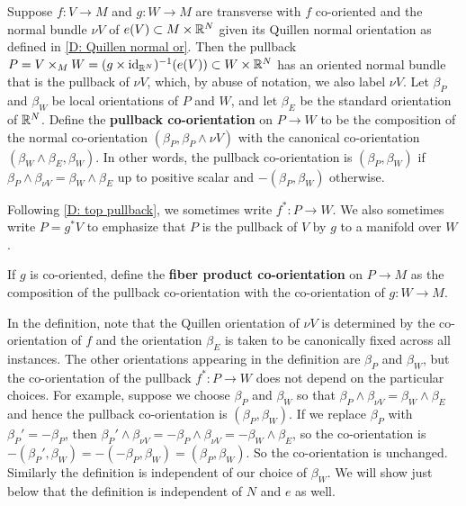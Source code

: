 \begin{definition}\label{D: pullback coorient}
	Suppose $f \colon V \to M$ and $g \colon W \to M$ are transverse with $f$ co-oriented and the normal bundle $\nu V$ of $e(V) \subset M \times \mathbb{R}^N$ given its Quillen normal orientation as defined in \cref{D: Quillen normal or}.
	Then the pullback $P = V \times_M W = (g \times \mathrm{id}_{\mathbb{R}^N})^{-1}(e(V)) \subset W \times \mathbb{R}^N$ has an oriented normal bundle that is the pullback of $\nu V$, which, by abuse of notation, we also label $\nu V$.
	Let $\beta_P$ and $\beta_W$ be local orientations of $P$ and $W$, and let $\beta_E$ be the standard orientation of $\mathbb{R}^N$.
	Define the \textbf{pullback co-orientation} on $P \to W$ to be the composition of the normal co-orientation $(\beta_P,\beta_P \wedge \nu V)$ with the canonical co-orientation $(\beta_W \wedge \beta_E,\beta_W)$.
	In other words, the pullback co-orientation is $(\beta_P,\beta_W)$ if $\beta_P \wedge \beta_{\nu V} = \beta_W \wedge \beta_E$ up to positive scalar and $-(\beta_P,\beta_W)$ otherwise.

	Following \cref{D: top pullback}, we sometimes write $f^* \colon P \to W$.
	We also sometimes write $P = g^*V$ to emphasize that $P$ is the pullback of $V$ by $g$ to a manifold over $W$.

	If $g$ is co-oriented, define the \textbf{fiber product co-orientation} on $P \to M$ as the composition of the pullback co-orientation with the co-orientation of $g \colon W \to M$.
\end{definition}

In the definition, note that the Quillen orientation of $\nu V$ is determined by the co-orientation of $f$ and the orientation $\beta_E$ is taken to be canonically fixed across all instances.
The other orientations appearing in the definition are $\beta_P$ and $\beta_W$, but the co-orientation of the pullback $f^* \colon P \to W$ does not depend on the particular choices.
For example, suppose we choose $\beta_P$ and $\beta_W$ so that $\beta_P \wedge \beta_{\nu V} = \beta_W \wedge \beta_E$ and hence the pullback co-orientation is $(\beta_P,\beta_W)$.
If we replace $\beta_P$ with $\beta_P' = -\beta_P$, then
$\beta_P' \wedge \beta_{\nu V} = -\beta_P \wedge \beta_{\nu V} = -\beta_W \wedge \beta_E$, so the co-orientation is $-(\beta_P',\beta_W) = -(-\beta_P,\beta_W) = (\beta_P,\beta_W)$.
So the co-orientation is unchanged.
Similarly the definition is independent of our choice of $\beta_W$.
We will show just below that the definition is independent of $N$ and $e$ as well.

